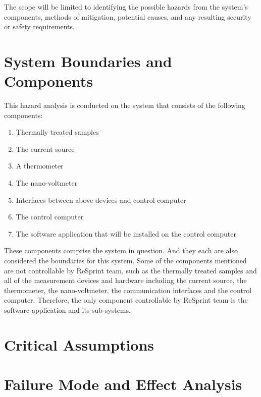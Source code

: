 \documentclass{article}
\begin{document}
\noindent The scope will be limited to identifying the possible hazards from the system's components, methods of mitigation, 
potential causes, and any resulting security or safety requirements.

\section{System Boundaries and Components}

\noindent This hazard analysis is conducted on the system that consists of the following components:

\begin{enumerate}
  \item Thermally treated samples
  \item The current source
  \item A thermometer
  \item The nano-voltmeter
  \item Interfaces between above devices and control computer
  \item The control computer
  \item The software application that will be installed on the control computer
\end{enumerate}

\noindent These components comprise the system in question. And they each are also considered the boundaries for this system. Some of the components mentioned are not controllable by ReSprint team, such as the thermally treated samples and all of the measurement devices and hardware including the current source, the thermometer, the nano-voltmeter, the communication interfaces and the control computer. Therefore, the only component controllable by ReSprint team is the software application and its sub-systems.

\section{Critical Assumptions}


\section{Failure Mode and Effect Analysis}
\end{document}
